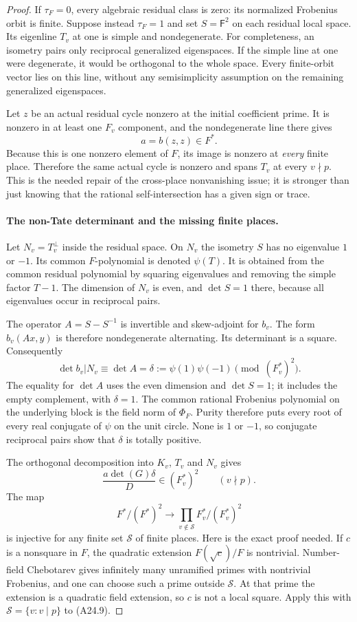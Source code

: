 \documentclass[11pt]{article}
\theoremstyle{remark}\newtheorem{remark}[theorem]{Remark}
\begin{document}
\begin{proof}
If $\tau_F=0$, every algebraic residual class is zero: its normalized
Frobenius orbit is finite.  Suppose instead $\tau_F=1$ and set
$S=\mathsf F^2$ on each residual local space.  Its eigenline $T_v$ at
one is simple and nondegenerate.  For completeness, an isometry pairs
only reciprocal generalized eigenspaces.  If the simple line at one
were degenerate, it would be orthogonal to the whole space.  Every
finite-orbit vector lies on this line, without any semisimplicity
assumption on the remaining generalized eigenspaces.

Let $z$ be an actual residual cycle nonzero at the initial coefficient
prime.  It is nonzero in at least one $F_v$ component, and the
nondegenerate line there gives
\[
                              a=b(z,z)\in F^*.
 \tag{A24.7}
\]
Because this is one nonzero element of $F$, its image is nonzero at
\emph{every} finite place.  Therefore the same actual cycle is nonzero
and spans $T_v$ at every $v\nmid p$.  This is the needed repair of the
cross-place nonvanishing issue; it is stronger than just knowing that
the rational self-intersection has a given sign or trace.

\paragraph{The non-Tate determinant and the missing finite places.}
Let $N_v=T_v^\perp$ inside the residual space.  On $N_v$ the isometry
$S$ has no eigenvalue $1$ or $-1$.  Its common $F$-polynomial is denoted
$\psi(T)$.  It is obtained from the common residual polynomial by
squaring eigenvalues and removing the simple factor $T-1$.
The dimension of $N_v$ is even, and $\det S=1$ there, because all
eigenvalues occur in reciprocal pairs.

The operator $A=S-S^{-1}$ is invertible and skew-adjoint for $b_v$.
The form $b_v(Ax,y)$ is therefore nondegenerate alternating.  Its
determinant is a square.  Consequently
\[
 \det b_v|N_v\equiv \det A
       =\delta:=\psi(1)\psi(-1)
                              \pmod{(F_v^*)^2}.
 \tag{A24.8}
\]
The equality for $\det A$ uses the even dimension and $\det S=1$;
it includes the empty complement, with $\delta=1$.
The common rational Frobenius polynomial on the underlying block is
the field norm of $\Phi_F$.  Purity therefore puts every root of every
real conjugate of $\psi$ on the unit circle.  None is $1$ or $-1$,
so conjugate reciprocal pairs show that $\delta$ is totally positive.

The orthogonal decomposition into $K_v$, $T_v$ and $N_v$ gives
\[
              \frac{a\det(G)\delta}{D}\in(F_v^*)^2
                             \qquad(v\nmid p).
 \tag{A24.9}
\]
The map
\[
 F^*/(F^*)^2\longrightarrow
             \prod_{v\notin\mathcal S}F_v^*/(F_v^*)^2
 \tag{A24.10}
\]
is injective for any finite set $\mathcal S$ of finite places.  Here
is the exact proof needed.  If $c$ is a nonsquare in $F$, the quadratic
extension $F(\sqrt c)/F$ is nontrivial.  Number-field Chebotarev gives
infinitely many unramified primes with nontrivial Frobenius, and one
can choose such a prime outside $\mathcal S$.  At that prime the
extension is a quadratic field extension, so $c$ is not a local square.
Apply this with $\mathcal S=\{v:v\mid p\}$ to (A24.9).


\end{proof}
\end{document}

